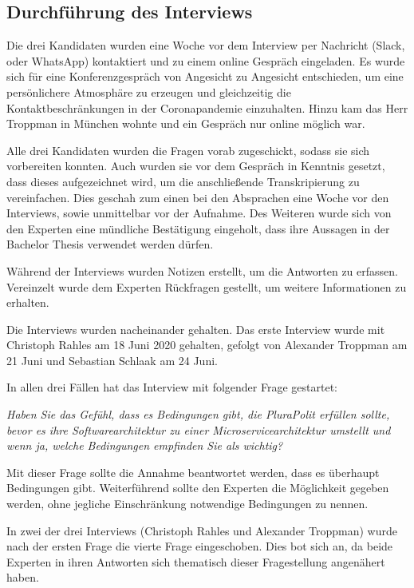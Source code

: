\subsection{Durchführung des Interviews}

Die drei Kandidaten wurden eine Woche vor dem Interview per Nachricht (Slack, oder WhatsApp) kontaktiert und zu einem online Gespräch eingeladen. Es wurde sich für eine Konferenzgespräch von Angesicht zu Angesicht entschieden, um eine persönlichere Atmosphäre zu erzeugen und gleichzeitig die Kontaktbeschränkungen in der Coronapandemie einzuhalten. Hinzu kam das Herr Troppman in München wohnte und ein Gespräch nur online möglich war.

Alle drei Kandidaten wurden die Fragen vorab zugeschickt, sodass sie sich vorbereiten konnten. Auch wurden sie vor dem Gespräch in Kenntnis gesetzt, dass dieses aufgezeichnet wird, um die anschließende Transkripierung zu vereinfachen. Dies geschah zum einen bei den Absprachen eine Woche vor den Interviews, sowie unmittelbar vor der Aufnahme. Des Weiteren wurde sich von den Experten eine mündliche Bestätigung eingeholt, dass ihre Aussagen in der Bachelor Thesis verwendet werden dürfen.

Während der Interviews wurden Notizen erstellt, um die Antworten zu erfassen. Vereinzelt wurde dem Experten Rückfragen gestellt, um weitere Informationen zu erhalten.

Die Interviews wurden nacheinander gehalten. Das erste Interview wurde mit Christoph Rahles am 18 Juni 2020 gehalten, gefolgt von Alexander Troppman am 21 Juni und Sebastian Schlaak am 24 Juni. 

In allen drei Fällen hat das Interview mit folgender Frage gestartet:

\textit{Haben Sie das Gefühl, dass es Bedingungen gibt, die PluraPolit erfüllen sollte, bevor es ihre Softwarearchitektur zu einer Microservicearchitektur umstellt und wenn ja, welche Bedingungen empfinden Sie als wichtig?}

Mit dieser Frage sollte die Annahme beantwortet werden, dass es überhaupt Bedingungen gibt. Weiterführend sollte den Experten die Möglichkeit gegeben werden, ohne jegliche Einschränkung notwendige Bedingungen zu nennen.

In zwei der drei Interviews (Christoph Rahles und Alexander Troppman) wurde nach der ersten Frage die vierte Frage eingeschoben. Dies bot sich an, da beide Experten in ihren Antworten sich thematisch dieser Fragestellung angenähert haben.

